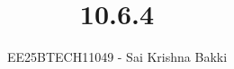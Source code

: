 \documentclass[journal]{IEEEtran}
\begin{document}

\vspace{3cm}

\title{10.6.4}
\author{EE25BTECH11049 - Sai Krishna Bakki}
\maketitle
\vspace{-3em}
{\let\newpage\relax\maketitle}

\renewcommand{\thefigure}{\theenumi}
\renewcommand{\thetable}{\theenumi}
\setlength{\intextsep}{10pt} %


\renewcommand{\thetable}{\theenumi}
\end{document}
